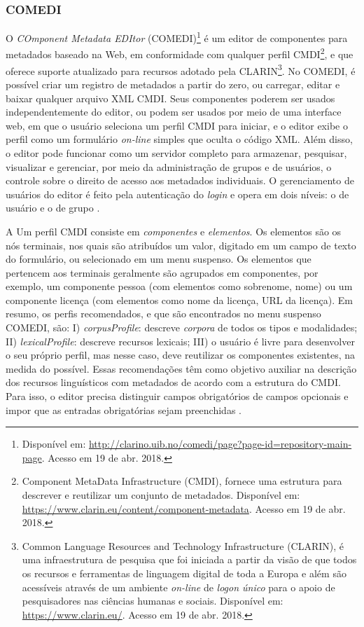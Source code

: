 \documentclass[portuguese]{textolivre}
\begin{document}
\subsubsection{COMEDI}\label{sec-resumo}
O \textit{COmponent Metadata EDItor} (COMEDI)\footnote{Disponível em: \url{http://clarino.uib.no/comedi/page?page-id=repository-main-page}. Acesso em 19 de abr. 2018.} é um editor de componentes para metadados baseado na Web, em conformidade com qualquer perfil CMDI\footnote{Component MetaData Infrastructure (CMDI), fornece uma estrutura para descrever e reutilizar um conjunto de metadados. Disponível em: \url{https://www.clarin.eu/content/component-metadata}. Acesso em 19 de abr. 2018.}, e que oferece suporte atualizado para recursos adotado pela CLARIN\footnote{Common Language Resources and Technology Infrastructure (CLARIN), é uma infraestrutura de pesquisa que foi iniciada a partir da visão de que todos os recursos e ferramentas de linguagem digital de toda a Europa e além são acessíveis através de um ambiente \textit{on-line} de \textit{logon único} para o apoio de pesquisadores nas ciências humanas e sociais. Disponível em: \url{https://www.clarin.eu/}. Acesso em 19 de abr. 2018.}. No COMEDI, é possível criar um registro de metadados a partir do zero, ou carregar, editar e baixar qualquer arquivo XML CMDI. Seus componentes poderem ser usados independentemente do editor, ou podem ser usados por meio de uma interface web, em que o usuário seleciona um perfil CMDI para iniciar, e o editor exibe o perfil como um formulário \textit{on-line} simples que oculta o código XML. Além disso, o editor pode funcionar como um servidor completo para armazenar, pesquisar, visualizar e gerenciar, por meio da administração de grupos e de usuários, o controle sobre o direito de acesso aos metadados individuais. O gerenciamento de usuários do editor é feito pela autenticação do \textit{login} e opera em dois níveis: o de usuário e o de grupo \cite{lyse_comedi:_2015}.

A Um perfil CMDI consiste em \textit{componentes} e \textit{elementos}. Os elementos são os nós terminais, nos quais são atribuídos um valor, digitado em um campo de texto do formulário, ou selecionado em um menu suspenso. Os elementos que pertencem aos terminais geralmente são agrupados em componentes, por exemplo, um componente pessoa (com elementos como sobrenome, nome) ou um componente licença (com elementos como nome da licença, URL da licença). Em resumo, os perfis recomendados, e que são encontrados no menu suspenso COMEDI, são: I) \textit{corpusProfile}: descreve \textit{corpora} de todos os tipos e modalidades; II) \textit{lexicalProfile}: descreve recursos lexicais; III) o usuário é livre para desenvolver o seu próprio perfil, mas nesse caso, deve reutilizar os componentes existentes, na medida do possível. Essas recomendações têm como objetivo auxiliar na descrição dos recursos linguísticos com metadados de acordo com a estrutura do CMDI. Para isso, o editor precisa distinguir campos obrigatórios de campos opcionais e impor que as entradas obrigatórias sejam preenchidas \cite{dima_metadata_2012}.
\end{document}
